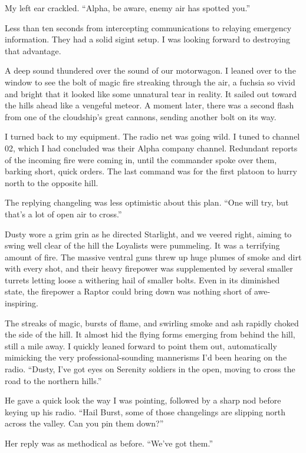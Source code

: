 My left ear crackled. “Alpha, be aware, enemy air has spotted you.”

Less than ten seconds from intercepting communications to relaying emergency information. They had a solid sigint setup. I was looking forward to destroying that advantage.

A deep sound thundered over the sound of our motorwagon. I leaned over to the window to see the bolt of magic fire streaking through the air, a fuchsia so vivid and bright that it looked like some unnatural tear in reality. It sailed out toward the hills ahead like a vengeful meteor. A moment later, there was a second flash from one of the cloudship’s great cannons, sending another bolt on its way.

I turned back to my equipment. The radio net was going wild. I tuned to channel 02, which I had concluded was their Alpha company channel. Redundant reports of the incoming fire were coming in, until the commander spoke over them, barking short, quick orders. The last command was for the first platoon to hurry north to the opposite hill.

The replying changeling was less optimistic about this plan. “One will try, but that’s a lot of open air to cross.”

Dusty wore a grim grin as he directed Starlight, and we veered right, aiming to swing well clear of the hill the Loyalists were pummeling. It was a terrifying amount of fire. The massive ventral guns threw up huge plumes of smoke and dirt with every shot, and their heavy firepower was supplemented by several smaller turrets letting loose a withering hail of smaller bolts. Even in its diminished state, the firepower a Raptor could bring down was nothing short of awe-inspiring.

The streaks of magic, bursts of flame, and swirling smoke and ash rapidly choked the side of the hill. It almost hid the flying forms emerging from behind the hill, still a mile away. I quickly leaned forward to point them out, automatically mimicking the very professional-sounding mannerisms I’d been hearing on the radio. “Dusty, I’ve got eyes on Serenity soldiers in the open, moving to cross the road to the northern hills.”

He gave a quick look the way I was pointing, followed by a sharp nod before keying up his radio. “Hail Burst, some of those changelings are slipping north across the valley. Can you pin them down?”

Her reply was as methodical as before. “We’ve got them.”

